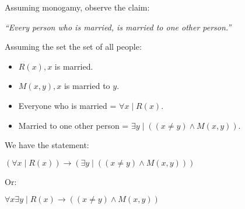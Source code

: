 \noindent
Assuming monogamy, observe the claim:

\begin{center}
    \Large
    \textit{``Every person who is married, is married to one other person.''}
\end{center}


Assuming the set the set of all people:
\begin{itemize}
    \item $R(x), x$ is married.
    \item $M(x, y), x$ is married to $y$.
    \item Everyone who is married = $\forall x \mid R(x)$.
    \item Married to one other person = $\exists y \mid ((x\neq y) \land M(x, y))$.
\end{itemize}

\noindent
We have the statement:

\begin{center}
    \Large
    $(\forall x \mid R(x)) \rightarrow (\exists y \mid ((x\neq y) \land M(x, y)))$
\end{center}

\noindent
Or:

\begin{center}
    \Large
    $\forall x \exists y \mid R(x) \rightarrow ((x\neq y) \land M(x, y))$
\end{center}